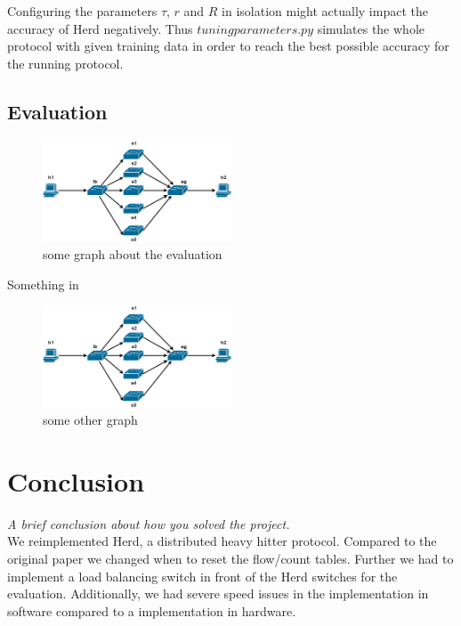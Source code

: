 \documentclass[11pt,oneside,a4paper]{article}
\newcommand{\hint}[1]{{\color{blue} \em #1}}
\begin{document}
Configuring the parameters $\tau$, $r$ and $R$ in isolation might actually impact the accuracy of Herd negatively. Thus $tuningparameters.py$ simulates the whole protocol with given training data in order to reach the best possible accuracy for the running protocol.

\subsection{Evaluation} \label{evaluation}
\begin{figure}
	\centering
	\includegraphics[width=0.5\textwidth]{figures/Herd_topology}
	\caption{some graph about the evaluation}
	\label{fig:topology_fig}
\end{figure}

\lipsum[1]
Something in %

\begin{figure}
	\centering
	\includegraphics[width=0.5\textwidth]{figures/Herd_topology}
	\caption{some other graph}
	\label{fig:topology_fig}
\end{figure}

\section{Conclusion}
\hint{A brief conclusion about how you solved the project.} \\
We reimplemented Herd, a distributed heavy hitter protocol. Compared to the original paper we changed when to reset the flow/count tables. Further we had to implement a load balancing switch in front of the Herd switches for the evaluation. Additionally, we had severe speed issues in the implementation in software compared to a implementation in hardware.
\end{document}
